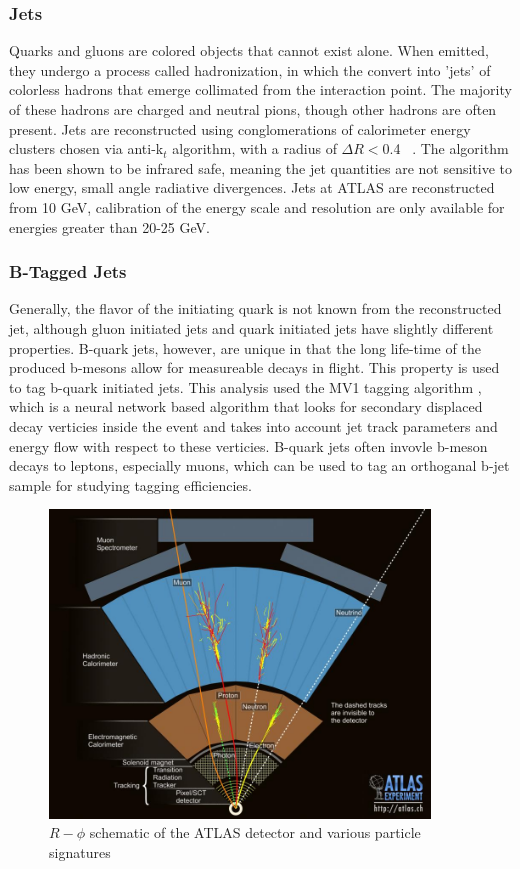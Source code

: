 \subsubsection{Jets}

Quarks and gluons are colored objects that cannot exist alone. When emitted, they undergo a process called hadronization, in which the convert into 'jets' of colorless hadrons that emerge collimated from the interaction point. The majority of these hadrons are charged and neutral pions, though other hadrons are often present. Jets are reconstructed using conglomerations of calorimeter energy clusters chosen via anti-k$_t$ algorithm, with a radius of $\Delta R <$0.4 ~\cite{Cacciari:2008gp}. The algorithm has been shown to be infrared safe, meaning the jet quantities are not sensitive to low energy, small angle radiative divergences. Jets at ATLAS are reconstructed from 10 GeV, calibration of the energy scale and resolution are only available for energies greater than 20-25 GeV. 

\subsubsection{B-Tagged Jets}
Generally, the flavor of the initiating quark is not known from the reconstructed jet, although gluon initiated jets and quark initiated jets have slightly different properties. B-quark jets, however, are unique in that the long life-time of the produced b-mesons allow for measureable decays in flight. This property is used to tag b-quark initiated jets. This analysis used the MV1 tagging algorithm \cite{ATLAS-CONF-2011-102}, which is a neural network based algorithm that looks for secondary displaced decay verticies inside the event and takes into account jet track parameters and energy flow with respect to these verticies. B-quark jets often invovle b-meson decays to leptons, especially muons, which can be used to tag an orthoganal b-jet sample for studying tagging efficiencies.

\begin{figure}
\centering 
\includegraphics[width=0.9\textwidth]{figs/lhc/particles.jpeg}
\caption{$R-\phi$ schematic of the ATLAS detector and various particle signatures}
\label{figure:lhc_particles}
\end{figure}



